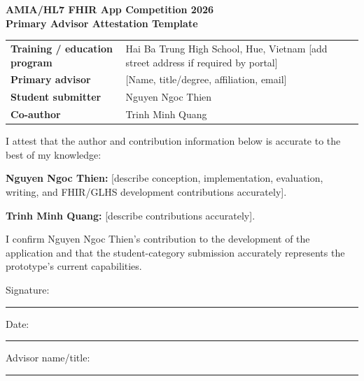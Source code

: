 \documentclass[11pt,letterpaper]{article}
\begin{document}
\begin{center}
{\Large\bfseries AMIA/HL7 FHIR App Competition 2026\\Primary Advisor Attestation Template}
\end{center}
\renewcommand{\arraystretch}{1.35}
\begin{tabularx}{\textwidth}{>{\bfseries}p{}X}
Training / education program & Hai Ba Trung High School, Hue, Vietnam [add street address if required by portal] \\
Primary advisor & [Name, title/degree, affiliation, email] \\
Student submitter & Nguyen Ngoc Thien \\
Co-author & Trinh Minh Quang \\
\end{tabularx}

I attest that the author and contribution information below is accurate to the best of my knowledge:

\textbf{Nguyen Ngoc Thien:} [describe conception, implementation, evaluation, writing, and FHIR/GLHS development contributions accurately].

\textbf{Trinh Minh Quang:} [describe contributions accurately].

I confirm Nguyen Ngoc Thien's contribution to the development of the application and that the student-category submission accurately represents the prototype's current capabilities.

\vfill
Signature: \rule{7cm}{0.4pt}\hfill Date: \rule{3cm}{0.4pt}

Advisor name/title: \rule{10cm}{0.4pt}
\end{document}
